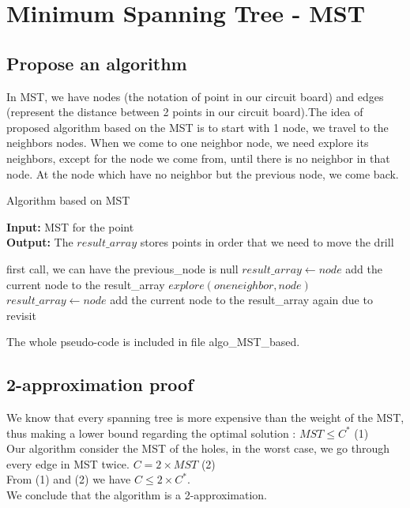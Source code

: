 \documentclass{article}
\begin{document}
\section{Minimum Spanning Tree - MST}

\subsection{Propose an algorithm}
In MST, we have nodes (the notation of point in our circuit board) and edges (represent the distance between 2 points in our circuit board).The idea of proposed algorithm based on the MST is to start with 1 node, we travel to the neighbors nodes. When we come to one neighbor node, we need explore its neighbors, except for the node we come from, until there is no neighbor in that node. At the node which have no neighbor but the previous node, we come back.

\begin{algorithm}[H]
\caption{Algorithm based on MST}
\textbf{Input: }MST for the point\\
\textbf{Output: }The $result\_array$ stores points in order that we need to move the drill
\begin{algorithmic} 
 \Comment first call, we can have the previous\_node is null
\State $result\_array \leftarrow node$  \Comment add the current node to the result\_array
    \State $explore(one neighbor, node)$
\EndWhile
\State $result\_array \leftarrow node$ \Comment add the current node to the result\_array again due to revisit
\EndProcedure
\end{algorithmic}
\end{algorithm}

The whole pseudo-code is included in file algo\_MST\_based.

\subsection{2-approximation proof}
We know that every spanning tree is more expensive than the weight of the MST, thus making a lower bound regarding the optimal solution :
$MST \leq C^{*}$  (1)\\
Our algorithm consider the MST of the holes, in the worst case, we go through every edge in MST twice.
$C = 2 \times MST$  (2)\\ 
From (1) and (2) we have $C \leq 2 \times C^{*}$.\\
We conclude that the algorithm is a 2-approximation.
\end{document}
